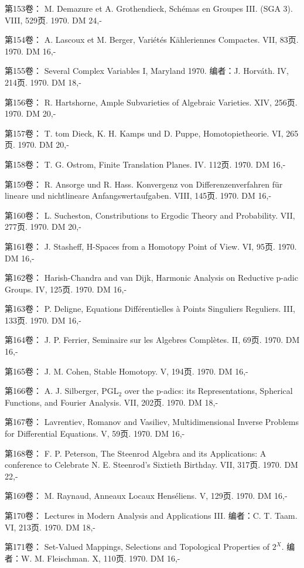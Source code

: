 第153卷： M. Demazure et A. Grothendieck, Schémas en Groupes III. (SGA 3). VIII, 529页. 1970. DM 24,-

第154卷： A. Lascoux et M. Berger, Variétés Kähleriennes Compactes. VII, 83页. 1970. DM 16,-

第155卷： Several Complex Variables I, Maryland 1970. 编者：J. Horváth. IV, 214页. 1970. DM 18,-

第156卷： R. Hartshorne, Ample Subvarieties of Algebraic Varieties. XIV, 256页. 1970. DM 20,-

第157卷： T. tom Dieck, K. H. Kamps und D. Puppe, Homotopietheorie. VI, 265页. 1970. DM 20,-

第158卷： T. G. Ostrom, Finite Translation Planes. IV. 112页. 1970. DM 16,-

第159卷： R. Ansorge und R. Hass. Konvergenz von Differenzenverfahren für lineare und nichtlineare Anfangswertaufgaben. VIII, 145页. 1970. DM 16,-

第160卷： L. Sucheston, Constributions to Ergodic Theory and Probability. VII, 277页. 1970. DM 20,-

第161卷： J. Stasheff, H-Spaces from a Homotopy Point of View. VI, 95页. 1970. DM 16,-

第162卷： Harish-Chandra and van Dijk, Harmonic Analysis on Reductive p-adic Groups. IV, 125页. 1970. DM 16,-

第163卷： P. Deligne, Equations Différentielles à Points Singuliers Reguliers. III, 133页. 1970. DM 16,-

第164卷： J. P. Ferrier, Seminaire sur les Algebres Complètes. II, 69页. 1970. DM 16,-

第165卷： J. M. Cohen, Stable Homotopy. V, 194页. 1970. DM 16,-

第166卷： A. J. Silberger, PGL$_2$ over the p-adics: its Representations, Spherical Functions, and Fourier Analysis. VII, 202页. 1970. DM 18,-

第167卷： Lavrentiev, Romanov and Vasiliev, Multidimensional Inverse Problems for Differential Equations. V, 59页. 1970. DM 16,-

第168卷： F. P. Peterson, The Steenrod Algebra and its Applications: A conference to Celebrate N. E. Steenrod's Sixtieth Birthday. VII, 317页. 1970. DM 22,-

第169卷： M. Raynaud, Anneaux Locaux Henséliens. V, 129页. 1970. DM 16,-

第170卷： Lectures in Modern Analysis and Applications III. 编者：C. T. Taam. VI, 213页. 1970. DM 18,-

第171卷： Set-Valued Mappings, Selections and Topological Properties of $2^X$. 编者：W. M. Fleischman. X, 110页. 1970. DM 16,-


